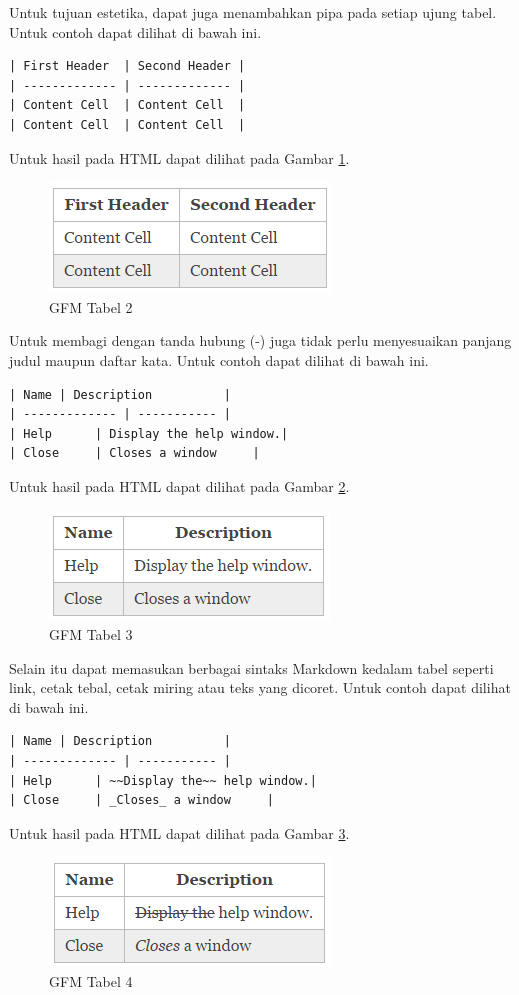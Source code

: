 Untuk tujuan estetika, dapat juga menambahkan pipa pada setiap ujung tabel.
Untuk contoh dapat dilihat di bawah ini.
\begin{lstlisting}
| First Header  | Second Header |
| ------------- | ------------- |
| Content Cell  | Content Cell  |
| Content Cell  | Content Cell  |
\end{lstlisting}
Untuk hasil pada HTML dapat dilihat pada Gambar \ref{fig:t2}.
\begin{figure}[H]
\centering
\includegraphics[scale=1]{Gambar/t2.png}
\caption[GFM Tabel 2]{GFM Tabel 2}
\label{fig:t2}
\end{figure}

Untuk membagi dengan tanda hubung (-) juga tidak perlu menyesuaikan panjang
judul maupun daftar kata. Untuk contoh dapat dilihat di bawah ini.
\begin{lstlisting}
| Name | Description          |
| ------------- | ----------- |
| Help      | Display the help window.|
| Close     | Closes a window     |
\end{lstlisting}
Untuk hasil pada HTML dapat dilihat pada Gambar \ref{fig:t3}.
\begin{figure}[H]
\centering
\includegraphics[scale=1]{Gambar/t3.png}
\caption[GFM Tabel 3]{GFM Tabel 3}
\label{fig:t3}
\end{figure}

Selain itu dapat memasukan berbagai sintaks Markdown kedalam tabel seperti link,
cetak tebal, cetak miring atau teks yang dicoret. Untuk contoh dapat dilihat di bawah ini.
\begin{lstlisting}
| Name | Description          |
| ------------- | ----------- |
| Help      | ~~Display the~~ help window.|
| Close     | _Closes_ a window     |
\end{lstlisting}
Untuk hasil pada HTML dapat dilihat pada Gambar \ref{fig:t4}.
\begin{figure}[H]
\centering
\includegraphics[scale=1]{Gambar/t4.png}
\caption[GFM Tabel 4]{GFM Tabel 4}
\label{fig:t4}
\end{figure}

